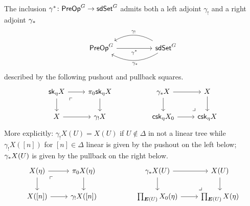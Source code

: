 \documentclass[a4paper,10pt
,draft
]{article}%
\numberwithin{equation}{section}
\numberwithin{figure}{section}
\theoremstyle{definition} %
\newcommand{\1}{\ensuremath{\mathbbm 1}}%
\begin{document}
The inclusion 
$\gamma^{\**} \colon \mathsf{PreOp}^G \to \mathsf{sdSet}^G$
admits both a left adjoint $\gamma_!$
and a right adjoint $\gamma_{\**}$
\[
      \begin{tikzcd}[column sep =5em]
            \mathsf{PreOp}^G \ar{r}[swap]{\gamma^{\**}} 
            &
            \mathsf{sdSet}^G
            \ar[bend right]{l}[swap,midway]{\gamma_{!}}
            \ar[bend left]{l}{\gamma_{\**}}
      \end{tikzcd}
\]
described by the following pushout and pullback squares.
\begin{equation}\label{GAMMASTAR_EQ}
\begin{tikzcd}
	\mathsf{sk}_{\eta} X \ar{r} \ar{d} \arrow[dr, phantom, "\ulcorner", very near start]  
&
	\pi_0 \mathsf{sk}_{\eta} X \ar{d}
&& 
	\gamma_{\**}X \ar{r} \ar{d} 
&
	X \ar{d}
\\
	X \ar{r} 
&
	\gamma_! X 
&&
	\mathsf{csk}_{\eta} X_0
	\ar{r} 
&
	\mathsf{csk}_{\eta} X 
	\arrow[lu, phantom, "\lrcorner", very near start]
\end{tikzcd}
\end{equation}
More explicitly: 
$\gamma_{!}X (U) = X(U)$ if $U \not \in \Delta$
in not a linear tree
while $\gamma_{!}X ([n])$ for $[n] \in \Delta$ linear is given by the pushout on the left below; 
$\gamma_{\**}X(U)$ is given by the pullback on the right below.
\begin{equation}\label{GAMMASTAR2_EQ}
      \begin{tikzcd}
            X(\eta) \ar{r} \ar{d} \arrow[dr, phantom, "\ulcorner", very near start]  &
            \pi_0 X(\eta) \ar{d}
            && 
            \gamma_{\**}X(U) \ar{r} \ar{d} & X(U) \ar{d}
            \\
            X([n]) \ar{r} & \gamma_! X([n]) 
            &&
            \prod_{\boldsymbol{E}(U)} X_0(\eta) \ar{r} &
            \prod_{\boldsymbol{E}(U)} X(\eta)
            \arrow[lu, phantom, "\lrcorner", very near start]
      \end{tikzcd}
\end{equation}


\end{document}
